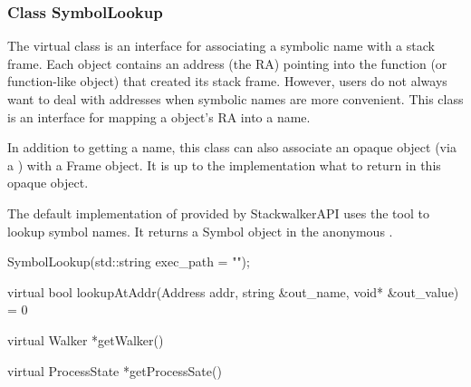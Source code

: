 \subsubsection{Class SymbolLookup}

The  virtual class is an interface for associating a symbolic
name with a stack frame. Each  object contains an address (the RA)
pointing into the function (or function-like object) that created its stack
frame. However, users do not always want to deal with addresses when symbolic
names are more convenient. This class is an interface for mapping a  object's RA into a name.

In addition to getting a name, this class can also associate an opaque object
(via a ) with a Frame object. It is up to the 
implementation what to return in this opaque object.

The default implementation of  provided by StackwalkerAPI
uses the  tool to lookup symbol names. It returns a Symbol
object in the anonymous .

\begin{apient}
SymbolLookup(std::string exec_path = "");
\end{apient}

\begin{apient}
virtual bool lookupAtAddr(Address addr, 
                          string &out_name, 
                          void* &out_value) = 0
\end{apient}

\begin{apient}
virtual Walker *getWalker()
\end{apient}

\begin{apient}
virtual ProcessState *getProcessSate()
\end{apient}

